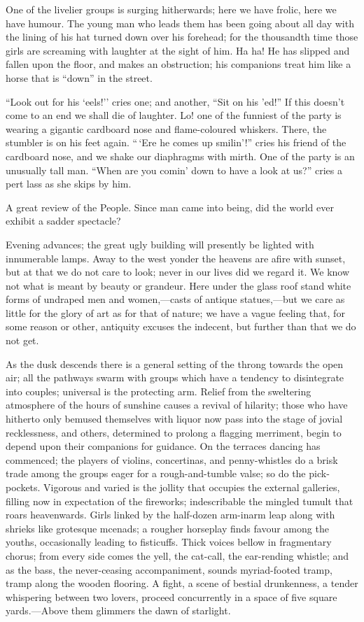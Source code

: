 One of the livelier groups is surging hitherwards; here we have frolic,
here we have humour. The young man who leads them has been going about
all day with the lining of his hat turned down over his forehead; for
the thousandth time those girls are screaming with laughter at the sight
of him. Ha ha! {\protect\hypertarget{267}{}{}}He has slipped and fallen
upon the floor, and makes an obstruction; his companions treat him like
a horse that is ``down'' in the street.

``Look out for his `eels!'' cries one; and another, ``Sit on his 'ed!''
If this doesn't come to an end we shall die of laughter. Lo! one of the
funniest of the party is wearing a gigantic cardboard nose and
flame-coloured whiskers. There, the stumbler is on his feet again.
``\,`Ere he comes up smilin'!'' cries his friend of the cardboard nose,
and we shake our diaphragms with mirth. One of the party is an unusually
tall man. ``When are you comin' down to have a look at us?'' cries a
pert lass as she skips by him.

A great review of the People. Since man came into being, did the world
ever exhibit a sadder spectacle?

Evening advances; the great ugly building will presently be lighted with
innumerable lamps. Away to the west yonder the heavens are afire with
sunset, but at that we do not care to look; never in our lives did we
regard it. We know not what is meant by beauty
{\protect\hypertarget{268}{}{}}or grandeur. Here under the glass roof
stand white forms of undraped men and women,---casts of antique
statues,---but we care as little for the glory of art as for that of
nature; we have a vague feeling that, for some reason or other,
antiquity excuses the indecent, but further than that we do not get.

As the dusk descends there is a general setting of the throng towards
the open air; all the pathways swarm with groups which have a tendency
to disintegrate into couples; universal is the protecting arm. Relief
from the sweltering atmosphere of the hours of sunshine causes a revival
of hilarity; those who have hitherto only bemused themselves with liquor
now pass into the stage of jovial recklessness, and others, determined
to prolong a flagging merriment, begin to depend upon their companions
for guidance. On the terraces dancing has commenced; the players of
violins, concertinas, and penny-whistles do a brisk trade among the
groups eager for a rough-and-tumble valse; so do the
{\protect\hypertarget{269}{}{}}pick-pockets. Vigorous and varied is the
jollity that occupies the external galleries, filling now in expectation
of the fireworks; indescribable the mingled tumult that roars
heavenwards. Girls linked by the half-dozen arm-inarm leap along with
shrieks like grotesque mcenads; a rougher horseplay finds favour among
the youths, occasionally leading to fisticuffs. Thick voices bellow in
fragmentary chorus; from every side comes the yell, the cat-call, the
ear-rending whistle; and as the bass, the never-ceasing accompaniment,
sounds myriad-footed tramp, tramp along the wooden flooring. A fight, a
scene of bestial drunkenness, a tender whispering between two lovers,
proceed concurrently in a space of five square yards.---Above them
glimmers the dawn of starlight.

